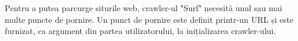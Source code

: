 Pentru a putea parcurge siturile web, crawler-ul "Surf" necesită unul sau mai multe puncte de pornire. Un punct de pornire este definit printr-un URL și este furnizat, ca argument din partea utilizatorului, la inițializarea crawler-ului.